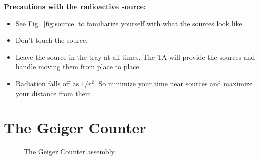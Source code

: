 \noindent
{\bf Precautions with the radioactive source:}
\begin{itemize}
\item See Fig.~\ref{fig:source} to familiarize yourself with what the sources look like.
\item Don't touch the source.
\item Leave the source in the tray at all times.  The TA will provide the sources and handle moving them from place to place.
\item Radiation falls off as $1/r^2$.  So minimize your time near sources and maximize your distance from them.
\end{itemize}


\section{The Geiger Counter}


\begin{figure}[htbp]
\begin{center}
\caption{\label{fig:geigersetup} The Geiger Counter assembly.}
\end{center}
\end{figure}

